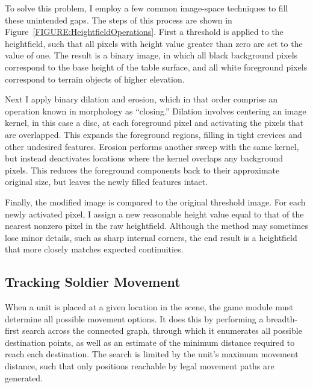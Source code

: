 \documentclass{thesis}
\begin{document}
To solve this problem, I employ a few common image-space techniques to fill these unintended gaps. The steps of this process are shown in Figure~\ref{FIGURE:HeightfieldOperations}. First a threshold is applied to the heightfield, such that all pixels with height value greater than zero are set to the value of one. The result is a binary image, in which all black background pixels correspond to the base height of the table surface, and all white foreground pixels correspond to terrain objects of higher elevation. 

Next I apply binary dilation and erosion, which in that order comprise an operation known in morphology as ``closing.'' Dilation involves centering an image kernel, in this case a disc, at each foreground pixel and activating the pixels that are overlapped. This expands the foreground regions, filling in tight crevices and other undesired features. Erosion performs another sweep with the same kernel, but instead deactivates locations where the kernel overlaps any background pixels. This reduces the foreground components back to their approximate original size, but leaves the newly filled features intact.

Finally, the modified image is compared to the original threshold image. For each newly activated pixel, I assign a new reasonable height value equal to that of the nearest nonzero pixel in the raw heightfield. Although the method may sometimes lose minor details, such as sharp internal corners, the end result is a heightfield that more closely matches expected continuities.

\subsection{Tracking Soldier Movement }

When a unit is placed at a given location in the scene, the game module must determine all possible movement options. It does this by performing a breadth-first search across the connected graph, through which it enumerates all possible destination points, as well as an estimate of the minimum distance required to reach each destination. The search is limited by the unit's maximum movement distance, such that only positions reachable by legal movement paths are generated.
\end{document}
